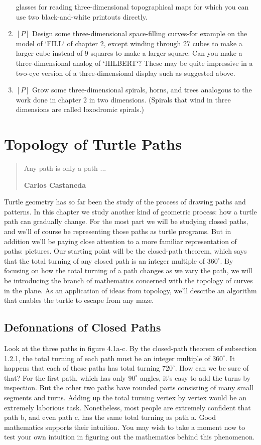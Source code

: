 \documentclass{book}
\begin{document}
\begin{enumerate}
glasses for reading three-dimensional topographical maps for which you
can use two black-and-white printouts directly.
\item $[P]$ Design some three-dimensional space-filling curves-for example 
on the model of \textsc{`FILL`} of chapter 2, except winding through 27 cubes to
make a larger cube instead of 9 squares to make a larger square. Can
you make a three-dimensional analog of \textsc{`HILBERT`}? These may be quite
impressive in a two-eye version of a three-dimensional display such as
suggested above.
\item $[P]$ Grow some three-dimensional spirals, horns, and trees analogous
to the work done in chapter 2 in two dimensions. (Spirals that wind in
three dimensions are called loxodromic spirals.)
\end{enumerate}

\chapter{Topology of Turtle Paths}
\begin{quote}
Any path is only a path ...

\textbf{Carlos Castaneda}
\end{quote}

Turtle geometry has so far been the study of the process of drawing
paths and patterns. In this chapter we study another kind of geometric
process: how a turtle path can gradually change. For the most part we
will be studying closed paths, and we'll of course be representing those
paths as turtle programs. But in addition we'll be paying close attention
to a more familiar representation of paths: pictures. Our starting point
will be the closed-path theorem, which says that the total turning of any
closed path is an integer multiple of $360^{\circ}$. By focusing on how the total
turning of a path changes as we vary the path, we will be introducing
the branch of mathematics concerned with the topology of curves in
the plane. As an application of ideas from topology, we'll describe an
algorithm that enables the turtle to escape from any maze.

\section{Defonnations of Closed Paths}

Look at the three paths in figure 4.1a-c. By the closed-path theorem
of subsection 1.2.1, the total turning of each path must be an integer
multiple of $360^{\circ}$. It happens that each of these paths has total turning
$720^{\circ}$. How can we be sure of that? For the first path, which has only
$90^{\circ}$ angles, it's easy to add the turns by inspection. But the other two
paths have rounded parts consisting of many small segments and turns.
Adding up the total turning vertex by vertex would be an extremely
laborious task. Nonetheless, most people are extremely confident that
path b, and even path c, has the same total turning as path a. Good
mathematics supports their intuition. You may wish to take a moment
now to test your own intuition in figuring out the mathematics behind
this phenomenon.
\end{document}
